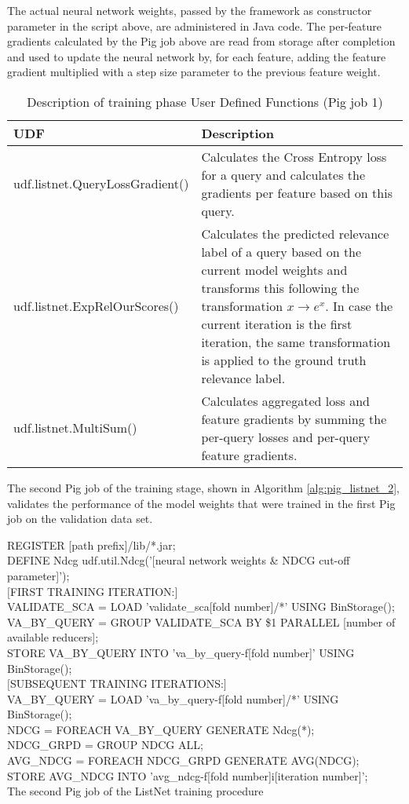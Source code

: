 The actual neural network weights, passed by the framework as constructor parameter in the script above, are administered in Java code. The per-feature gradients calculated by the Pig job above are read from storage after completion and used to update the neural network by, for each feature, adding the feature gradient multiplied with a step size parameter to the previous feature weight.

\begin{table}
\centering
\begin{tabular}{p{6cm}p{7cm}}\toprule
UDF & Description \\
\midrule
udf.listnet.QueryLossGradient() & Calculates the Cross Entropy loss for a query and calculates the gradients per feature based on this query.\\
udf.listnet.ExpRelOurScores() & Calculates the predicted relevance label of a query based on the current model weights and transforms this following the transformation $x \rightarrow e^{x}$. In case the current iteration is the first iteration, the same transformation is applied to the ground truth relevance label.\\
udf.listnet.MultiSum() & Calculates aggregated loss and feature gradients by summing the per-query losses and per-query feature gradients.\\
\bottomrule
\end{tabular}
\caption{Description of training phase User Defined Functions (Pig job 1)}
\label{tbl:training_udfs_1}
\end{table}

The second Pig job of the training stage, shown in Algorithm \ref{alg:pig_listnet_2}, validates the performance of the model weights that were trained in the first Pig job on the validation data set.\\

\begin{algorithm}
REGISTER [path prefix]/lib/*.jar;\\
DEFINE Ndcg udf.util.Ndcg('[neural network weights \& NDCG cut-off parameter]');\\
$[$FIRST TRAINING ITERATION:$]$\\
\Indp
	VALIDATE\_SCA = LOAD 'validate\_sca[fold number]/*' USING BinStorage();\\
	VA\_BY\_QUERY = GROUP VALIDATE\_SCA BY \$1 PARALLEL [number of available reducers];\\
	STORE VA\_BY\_QUERY INTO 'va\_by\_query-f[fold number]' USING BinStorage();\\
\Indm 
$[$SUBSEQUENT TRAINING ITERATIONS:$]$\\
\Indp
VA\_BY\_QUERY = LOAD 'va\_by\_query-f[fold number]/*' USING BinStorage();\\
\Indm 
NDCG = FOREACH VA\_BY\_QUERY GENERATE Ndcg(*);\\
NDCG\_GRPD = GROUP NDCG ALL;\\
AVG\_NDCG = FOREACH NDCG\_GRPD GENERATE AVG(NDCG);\\
STORE AVG\_NDCG INTO 'avg\_ndcg-f[fold number]i[iteration number]';\\
\caption{The second Pig job of the ListNet training procedure}
\label{alg:pig_listnet_2}
\end{algorithm}

